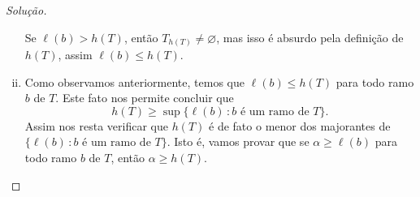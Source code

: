 \documentclass[a4paper]{article}
\begin{document}
\begin{proof}[Solução]
\begin{enumerate}[(i)]
\par 

Se \(\ell(b)> h(T)\), então \(T_{h(T)}\neq\varnothing\), mas isso é absurdo pela definição de \(h(T)\), assim \(\ell(b)\leq h(T)\).


        
      \item Como observamos anteriormente, temos que  \(\ell (b)\leq h(T)\) para
        todo ramo \(b\) de \(T\). Este fato nos permite concluir que
        \[h(T)\geq\sup\{\ell(b)\,\colon b \text{ é um ramo de } T\}.\]
        Assim nos resta verificar que \(h(T)\) é de fato o menor dos majorantes
         de \(\{\ell(b)\,\colon b \text{ é um ramo de } T\}\). Isto é, vamos
         provar que se \(\alpha\geq  \ell (b)\)
        para todo ramo \(b\) de \(T\), então \(\alpha\geq h(T)\).
        

\end{enumerate}
\end{proof}
\end{document}

